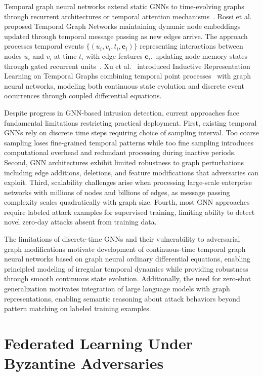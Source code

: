 Temporal graph neural networks extend static GNNs to time-evolving graphs through recurrent architectures or temporal attention mechanisms~\cite{kazemi2020representation}. Rossi et al.~\cite{rossi2020temporal} proposed Temporal Graph Networks maintaining dynamic node embeddings updated through temporal message passing as new edges arrive. The approach processes temporal events $\{(u_i, v_i, t_i, \mathbf{e}_i)\}$ representing interactions between nodes $u_i$ and $v_i$ at time $t_i$ with edge features $\mathbf{e}_i$, updating node memory states through gated recurrent units~\cite{cho2014learning}. Xu et al.~\cite{xu2020inductive} introduced Inductive Representation Learning on Temporal Graphs combining temporal point processes~\cite{hawkes1971spectra} with graph neural networks, modeling both continuous state evolution and discrete event occurrences through coupled differential equations.

Despite progress in GNN-based intrusion detection, current approaches face fundamental limitations restricting practical deployment. First, existing temporal GNNs rely on discrete time steps requiring choice of sampling interval. Too coarse sampling loses fine-grained temporal patterns while too fine sampling introduces computational overhead and redundant processing during inactive periods. Second, GNN architectures exhibit limited robustness to graph perturbations including edge additions, deletions, and feature modifications that adversaries can exploit. Third, scalability challenges arise when processing large-scale enterprise networks with millions of nodes and billions of edges, as message passing complexity scales quadratically with graph size. Fourth, most GNN approaches require labeled attack examples for supervised training, limiting ability to detect novel zero-day attacks absent from training data.

The limitations of discrete-time GNNs and their vulnerability to adversarial graph modifications motivate development of continuous-time temporal graph neural networks based on graph neural ordinary differential equations, enabling principled modeling of irregular temporal dynamics while providing robustness through smooth continuous state evolution. Additionally, the need for zero-shot generalization motivates integration of large language models with graph representations, enabling semantic reasoning about attack behaviors beyond pattern matching on labeled training examples.

\section{Federated Learning Under Byzantine Adversaries}
\label{sec:lit_federated}

